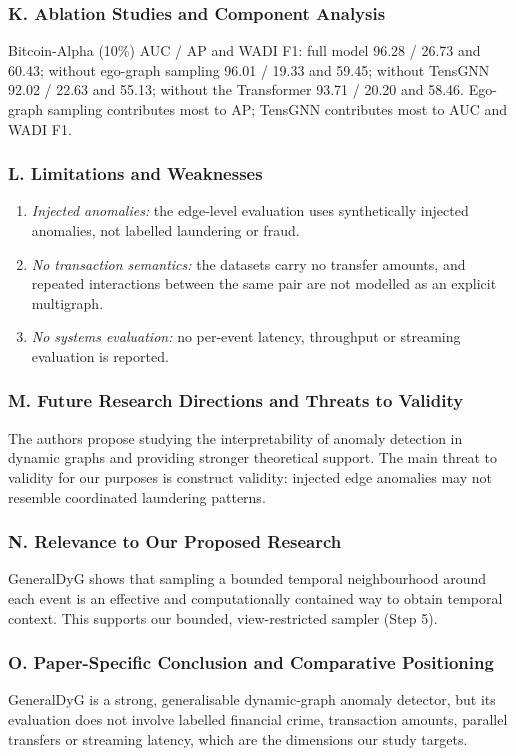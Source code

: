 \documentclass[11pt,a4paper]{article}
\begin{document}
\subsubsection*{K. Ablation Studies and Component Analysis}
Bitcoin-Alpha (10\%) AUC / AP and WADI F1: full model 96.28 / 26.73 and 60.43; without ego-graph sampling 96.01 / 19.33 and 59.45; without TensGNN 92.02 / 22.63 and 55.13; without the Transformer 93.71 / 20.20 and 58.46. Ego-graph sampling contributes most to AP; TensGNN contributes most to AUC and WADI F1.

\subsubsection*{L. Limitations and Weaknesses}
\begin{enumerate}[leftmargin=*]
    \item \textit{Injected anomalies:} the edge-level evaluation uses synthetically injected anomalies, not labelled laundering or fraud.
    \item \textit{No transaction semantics:} the datasets carry no transfer amounts, and repeated interactions between the same pair are not modelled as an explicit multigraph.
    \item \textit{No systems evaluation:} no per-event latency, throughput or streaming evaluation is reported.
\end{enumerate}

\subsubsection*{M. Future Research Directions and Threats to Validity}
The authors propose studying the interpretability of anomaly detection in dynamic graphs and providing stronger theoretical support. The main threat to validity for our purposes is construct validity: injected edge anomalies may not resemble coordinated laundering patterns.

\subsubsection*{N. Relevance to Our Proposed Research}
GeneralDyG shows that sampling a bounded temporal neighbourhood around each event is an effective and computationally contained way to obtain temporal context. This supports our bounded, view-restricted sampler (Step 5).

\subsubsection*{O. Paper-Specific Conclusion and Comparative Positioning}
GeneralDyG is a strong, generalisable dynamic-graph anomaly detector, but its evaluation does not involve labelled financial crime, transaction amounts, parallel transfers or streaming latency, which are the dimensions our study targets.
\end{document}
